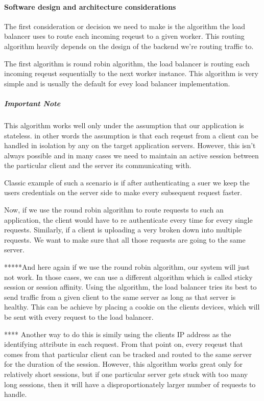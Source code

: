 \documentclass[a4paper, 11pt]{book}
\begin{document}
{    \paragraph{Software design and architecture considerations}
    The first consideration or decision we need to make is the algorithm the load balancer uses to route each incoming reqeust to a given worker.
    This routing algorithm heavily depends on the design of the backend we're routing traffic to.

    The first algorithm is round robin algorithm, the load balancer is routing each incoming reqeust sequentially to the next worker instance.
    This algorithm is very simple and is usually the default for evey load balancer implementation.

    \subparagraph{Important Note} This algorithm works well only under the assumption that our application is stateless.
    in other words the assumption is that each reqeust from a client can be handled in isolation by any on the target application servers.
    However, this isn't always possible and in many cases we need to maintain an active session between the particular client and the server its communicating with.

    Classic example of such a scenario is if after authenticating a suer we keep the users credentials on the server side to make every subsequent request faster.

    Now, if we use the round robin algorithm to route requests to such an application, the client would have to re authenticate every time for every single requests.
    Similarly, if a client is uploading a very broken down into multiple requests.
    We want to make sure that all those requests are going to the same server.

    *****And here again if we use the round robin algorithm, our system will just not work.
    In those cases, we can use a different algorithm which is called sticky session or session affinity.
    Using the algorithm, the load balancer tries its best to send traffic from a given client to the same server as long as that server is healthy.
    This can be achieve by placing a cookie on the clients devices, which will be sent with every request to the load balancer.


    **** Another way to do this is simily using the clients IP address as the identifying attribute in each request.
    From that point on, every reqeust that comes from that particular client can be tracked and routed to the same server for the duration of the session.
    However, this algorithm works great only for relatively short sessions, but if one particular server gets stuck with too many long sessions, then it will have a disproportionately larger number of requests to handle.

}
\end{document}
